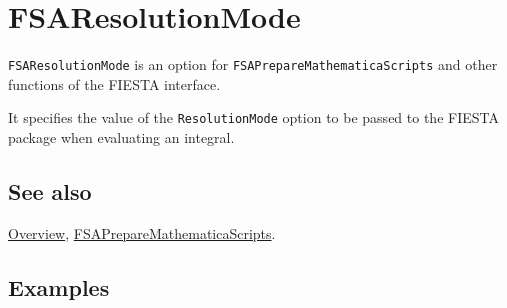 \documentclass[../FeynHelpersManual.tex]{subfiles}
\begin{document}
\begin{Shaded}
\begin{Highlighting}[]
 
\end{Highlighting}
\end{Shaded}

\hypertarget{fsaresolutionmode}{
\section{FSAResolutionMode}\label{fsaresolutionmode}}

\texttt{FSAResolutionMode} is an option for
\texttt{FSAPrepareMathematicaScripts} and other functions of the FIESTA
interface.

It specifies the value of the \texttt{ResolutionMode} option to be
passed to the FIESTA package when evaluating an integral.

\subsection{See also}

\hyperlink{toc}{Overview},
\hyperlink{fsapreparemathematicascripts}{FSAPrepareMathematicaScripts}.

\subsection{Examples}
\end{document}
